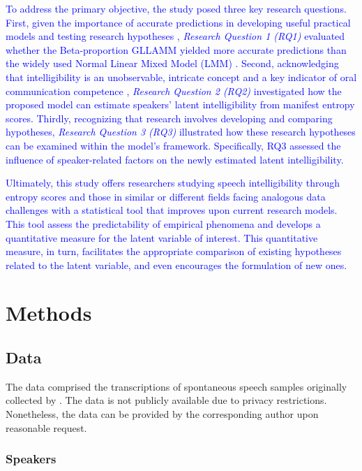 \documentclass[
  authoryear,
  preprint,
  1p]{elsarticle}
\begin{document}
\textcolor{blue}{To address the primary objective, the study posed three key research
questions. First, given the importance of accurate predictions in
developing useful practical models and testing research hypotheses
\citep{Shmueli_et_al_2012}, \emph{Research Question 1 (RQ1)} evaluated
whether the Beta-proportion GLLAMM yielded more accurate predictions
than the widely used Normal Linear Mixed Model (LMM)
\citep{Holmes_et_al_2019}. Second, acknowledging that intelligibility is
an unobservable, intricate concept and a key indicator of oral
communication competence \citep{Kent_et_al_1994}, \emph{Research
Question 2 (RQ2)} investigated how the proposed model can estimate
speakers' latent intelligibility from manifest entropy scores. Thirdly,
recognizing that research involves developing and comparing hypotheses,
\emph{Research Question 3 (RQ3)} illustrated how these research
hypotheses can be examined within the model's framework. Specifically,
RQ3 assessed the influence of speaker-related factors on the newly
estimated latent intelligibility.}

\textcolor{blue}{Ultimately, this study offers researchers studying speech
intelligibility through entropy scores and those in similar or different
fields facing analogous data challenges with a statistical tool that
improves upon current research models. This tool assess the
predictability of empirical phenomena and develops a quantitative
measure for the latent variable of interest. This quantitative measure,
in turn, facilitates the appropriate comparison of existing hypotheses
related to the latent variable, and even encourages the formulation of
new ones.}

\section{Methods}\label{sec-methods}

\subsection{Data}\label{sec-M-D}

The data comprised the transcriptions of spontaneous speech samples
originally collected by \citet{Boonen_et_al_2023}. The data is not
publicly available due to privacy restrictions. Nonetheless, the data
can be provided by the corresponding author upon reasonable request.

\subsubsection{Speakers}\label{sec-M-S}
\end{document}
